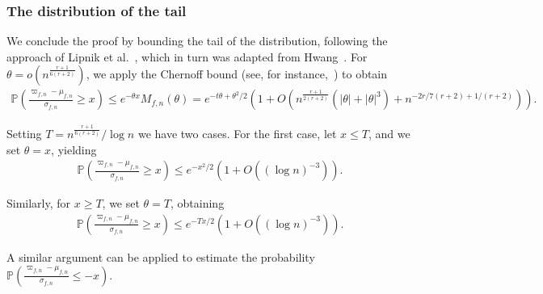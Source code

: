 \documentclass[12pt, oneside,reqno]{amsart}
\numberwithin{equation}{section}
\begin{document}
\subsubsection{The distribution of the tail}

We conclude the proof by bounding the tail of the distribution, following the approach of Lipnik et al.~\cite{lipniketal}, which in turn was adapted from Hwang~\cite{hwang}. For $\theta=o(n^{\frac{r+1}{6(r+2)}})$, we apply the Chernoff bound (see, for instance,~\cite{chernoff}) to obtain
\begin{align*}
\mathbb{P}\left(\frac{\varpi_{f,n}-\mu_{f,n}}{\sigma_{f,n}}\geq x\right)
\leq e^{-\theta x} M_{f,n}(\theta)
=e^{-t\theta+\theta^2/2}\left(1+O\left(n^{\frac{r+1}{2(r+2)}}(|\theta|+|\theta|^3)+n^{-2r/7(r+2)+1/(r+2)}\right)\right).
\end{align*}

\noindent
Setting $T=n^{\frac{r+1}{6(r+2)}}/\log n$ we have two cases. For the first case, let $x\leq T$, and we set $\theta=x$, yielding
\begin{align*}
\mathbb{P}\left(\frac{\varpi_{f,n}-\mu_{f,n}}{\sigma_{f,n}}\geq x\right)  
\leq e^{-x^2/2}\left(1+O((\log n)^{-3})\right).
\end{align*}

\noindent
Similarly, for $x\geq T$, we set $\theta=T$, obtaining 
\begin{align*}
\mathbb{P}\left(\frac{\varpi_{f,n}-\mu_{f,n}}{\sigma_{f,n}}\geq x\right)  
\leq e^{-Tx/2}\left(1+O((\log n)^{-3})\right).
\end{align*}

\noindent
A similar argument can be applied to estimate the probability $\mathbb{P}\left(\frac{\varpi_{f,n}-\mu_{f,n}}{\sigma_{f,n}}\leq -x\right)$.
\end{document}

